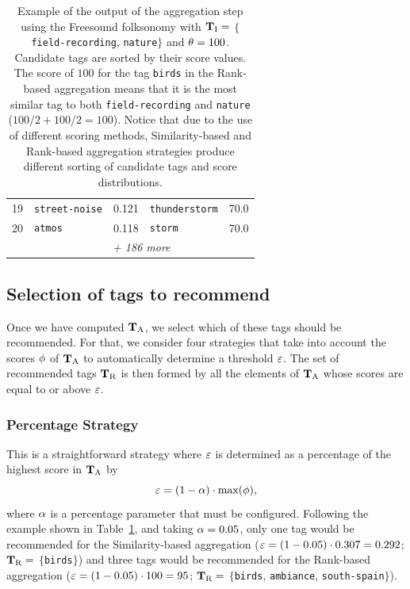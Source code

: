 \begin{table}
\begin{center}
{\begin{tabular}{@{}l@{\hskip 1.0cm}lr@{\hskip 1.0cm}lr@{}}
      19 & \texttt{street-noise} & 0.121 & \texttt{thunderstorm} & 70.0  \\
      20 & \texttt{atmos} & 0.118 & \texttt{storm} & 70.0  \\ 
      \multicolumn{1}{l}{}  &  \multicolumn{4}{c}{\rule{0pt}{3ex} \emph{+ 186 more}} \\
      \bottomrule
    \end{tabular}
    }
    \caption[Example of the output of the aggregation step]{Example of the output of the aggregation step using the Freesound folksonomy with $\mathbf{T}_{\text{I}}=$ $\lbrace$\texttt{field-recording}, \texttt{nature}$\rbrace$ and $\theta=100$. Candidate tags are sorted by their score values. The score of $100$ for the tag \texttt{birds} in the Rank-based aggregation means that it is the most similar tag to both \texttt{field-recording} and \texttt{nature} ($100/2 + 100/2 = 100$). Notice that due to the use of different scoring methods, Similarity-based and Rank-based aggregation strategies produce different sorting of candidate tags and score distributions.}
  \label{tab:aggregation_examples}
  \end{center}
\end{table}


\subsection{Selection of tags to recommend}

Once we have computed $\mathbf{T}_{\text{A}}$, we select which of these tags should be recommended. For that, we consider four strategies that take into account the scores $\phi$ of $\mathbf{T}_{\text{A}}$ to automatically determine a threshold $\varepsilon$.  The set of recommended tags $\mathbf{T}_{\text{R}}$ is then formed by all the elements of $\mathbf{T}_{\text{A}}$ whose scores are equal to or above $\varepsilon$.


\subsubsection{Percentage Strategy}
\label{sec:general:percentage_strategy}

This is a straightforward strategy where $\varepsilon$ is determined as a percentage of the highest score in $\mathbf{T}_{\text{A}}$ by 
\begin{equation*}
  \varepsilon = (1-\alpha)\cdot \text{max}(\phi) ,
\end{equation*}
where $\alpha$ is a percentage parameter that must be configured. Following the example shown in Table~\ref{tab:aggregation_examples}, and taking $\alpha=0.05$, only one tag would be recommended for the Similarity-based aggregation ($\varepsilon=(1-0.05)\cdot 0.307 = 0.292$; $\mathbf{T}_{\text{R}}=$ $\lbrace$\texttt{birds}$\rbrace$) and three tags would be recommended for the Rank-based aggregation ($\varepsilon=(1-0.05)\cdot 100 = 95$; $\mathbf{T}_{\text{R}}=$ $\lbrace$\texttt{birds}, \texttt{ambiance}, \texttt{south-spain}$\rbrace$).


